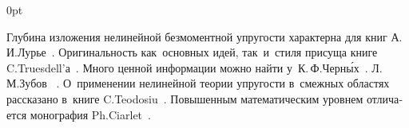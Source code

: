 \begin{changemargin}{\parindent}{0pt}
\fontsize{10}{12}\selectfont

\begin{otherlanguage}{russian}

Глубина изложения нелинейной безмоментной упругости характерна для книг А.\,И.\:Лурье~\cite{lurie-nonlinearelasticity, lurie-theoryofelasticity}.
Оригинальность как~основных идей, так~и~стиля присуща книге C.\:Truesdell’а~\cite{truesdell-firstcourse}.
Много ценной информации можно найти у~К.\,Ф.\:Черн\'{ы}х~\cite{chernyh-nonlinearelasticity}.
Л.\,М.\:Зубов~\cite{zubov} .
О~применении нелинейной теории упругости в~смежных областях рассказано в~книге C.\:Teodosiu~\cite{teodosiu-crystaldefects}.
Повышенным математическим уровнем отличается монография Ph.\:Ciarlet~\cite{ciarlet-mathematicalelasticity}.
\par

\end{otherlanguage}

\end{changemargin}
